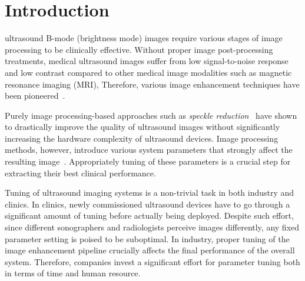 
\section{Introduction}\label{section:introduction}
 ultrasound B-mode (brightness mode) images require various stages of image processing to be clinically effective.
Without proper image post-processing treatments, medical ultrasound images suffer from low signal-to-noise response and low contrast compared to other medical image modalities such as magnetic resonance imaging (MRI), 
Therefore, various image enhancement techniques have been pioneered~\cite{contrerasortiz_ultrasound_2012}.

Purely image processing-based approaches such as \textit{speckle reduction}~\cite{finn_echocardiographic_2011, duarte-salazar_speckle_2020} have shown to drastically improve the quality of ultrasound images without significantly increasing the hardware complexity of ultrasound devices. 
Image processing methods, however, introduce various system parameters that strongly affect the resulting image~\cite{duarte-salazar_speckle_2020}.
Appropriately tuning of these parameters is a crucial step for extracting their best clinical performance.%

Tuning of ultrasound imaging systems is a non-trivial task in both industry and clinics.
In clinics, newly commissioned ultrasound devices have to go through a significant amount of tuning before actually being deployed.
Despite such effort, since different sonographers and radiologists perceive images differently, any fixed parameter setting is poised to be suboptimal.
In industry, proper tuning of the image enhancement pipeline crucially affects the final performance of the overall system.
Therefore, companies invest a significant effort for parameter tuning both in terms of time and human resource.

